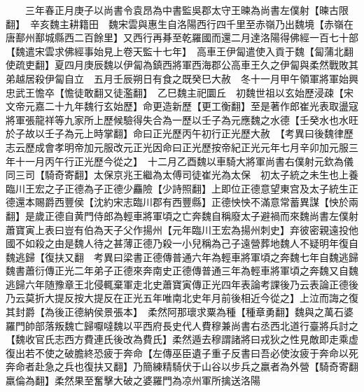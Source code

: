 　　三年春正月庚子以尚書令袁昂為中書監吳郡太守王暕為尚書左僕射【暕古限翻】　辛亥魏主耕籍田　魏宋雲與惠生自洛陽西行四千里至赤嶺乃出魏境【赤嶺在唐鄯州鄯城縣西二百餘里】又西行再朞至乾羅國而還二月達洛陽得佛經一百七十部【魏遣宋雲求佛經事始見上卷天監十七年】　高車王伊匐遣使入貢于魏【匐蒲北翻使疏吏翻】夏四月庚辰魏以伊匐為鎮西將軍西海郡公高車王久之伊匐與柔然戰敗其弟越居殺伊匐自立　五月壬辰朔日有食之既癸巳大赦　冬十一月甲午領軍將軍始興忠武王憺卒【憺徒敢翻又徒濫翻】　乙巳魏主祀圜丘　初魏世祖以玄始歷浸疎【宋文帝元嘉二十九年魏行玄始歷】命更造新歷【更工衡翻】至是著作郎崔光表取盪寇將軍張龍祥等九家所上歷候驗得失合為一歷以壬子為元應魏之水德【壬癸水也水旺於子故以壬子為元上時掌翻】命曰正光歷丙午初行正光歷大赦　【考異曰後魏律歷志云歷成會孝明帝加元服改元正光因命曰正光歷按帝紀正光元年七月辛卯加元服三年十一月丙午行正光歷今從之】　十二月乙酉魏以車騎大將軍尚書右僕射元欽為儀同三司【騎奇寄翻】太保京兆王繼為太傅司徒崔光為太保　初太子統之未生也上養臨川王宏之子正德為子正德少麤險【少詩照翻】上即位正德意望東宫及太子統生正德還本賜爵西豐侯【沈約宋志臨川郡有西豐縣】正德怏怏不滿意常蓄異謀【怏於兩翻】是歲正德自黄門侍郎為輕車將軍頃之亡奔魏自稱廢太子避禍而來魏尚書左僕射蕭寶寅上表曰豈有伯為天子父作揚州【元年臨川王宏為揚州刺史】弃彼密親遠投他國不如殺之由是魏人待之甚薄正德乃殺一小兒稱為己子遠營葬地魏人不疑明年復自魏逃歸【復扶又翻　考異曰梁書正德傳普通六年為輕車將軍頃之奔魏七年自魏逃歸魏書蕭衍傳正光二年弟子正德來奔南史正德傳普通三年為輕車將軍頃之奔魏又自魏逃歸六年随豫章王北侵輒棄軍走北史蕭寶寅傳正光四年表論考課後乃云表論正德後乃云莫折大提反按大提反在正光五年唯南北史年月前後相近今從之】上泣而誨之復其封爵【為後正德納侯景張本】　柔然阿那瓌求粟為種【種章勇翻】魏與之萬石婆羅門帥部落叛魏亡歸嚈噠魏以平西府長史代人費穆兼尚書右丞西北道行臺將兵討之【魏收官氏志西方費連氏後改為費氏】柔然遁去穆謂諸將曰戎狄之性見敵即走乘虚復出若不使之破膽終恐疲于奔命【左傳巫臣遺子重子反書曰吾必使汝疲于奔命以死奔命者赴急之兵也復扶又翻】乃簡練精騎伏于山谷以步兵之羸者為外營【騎奇寄翻羸倫為翻】柔然果至奮擊大破之婆羅門為凉州軍所擒送洛陽

